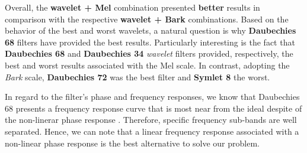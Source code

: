 	\par Overall, the \textbf{wavelet + Mel} combination  presented \textbf{better} results in comparison with the respective \textbf{wavelet + Bark} combinations. Based on the behavior of the best and worst wavelets, a natural question is why \textbf{Daubechies 68} filters have provided the best results. Particularly interesting is the fact that \textbf{Daubechies 68} and \textbf{Daubechies 34} \textit{wavelet} filters provided, respectively, the best and worst results associated with the Mel scale. In contrast, adopting the \textit{Bark} scale, \textbf{Daubechies 72} was the best filter and \textbf{Symlet 8} the worst.
	\\
	
	
	\par In regard to the filter's phase and frequency responses, we know that Daubechies 68 presents a frequency response curve that is most near from the ideal despite of the non-linerar phase response \cite{WaveletPropertiesBrowser}. Therefore, specific frequency sub-bands are well separated. Hence, we can note that a linear frequency response associated with a non-linear phase response is the best alternative to solve our problem. 
	\\
	
	
	
